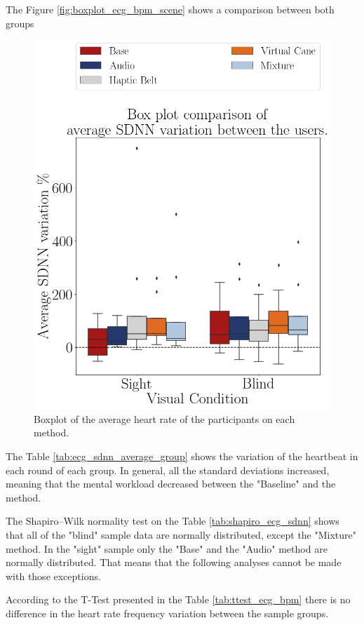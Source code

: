 The Figure \ref{fig:boxplot_ecg_bpm_scene} shows a comparison between both groups

\begin{figure}[!htb]
    \centering
    \includegraphics[width = 0.5\linewidth]{Resultados/ECG/Figuras/png/boxplot_ecg_sdnn_box_scene.png}
    \caption{Boxplot of the average heart rate of the participants on each method.}
    \label{fig:boxplot_ecg_sdnn_box_scene}
\end{figure}

The Table \ref{tab:ecg_sdnn_average_group} shows the variation of the heartbeat in each round of each group. In general, all the standard deviations increased, meaning that the mental workload decreased between the "Baseline" and the method.



The Shapiro–Wilk normality test on the Table \ref{tab:shapiro_ecg_sdnn} shows that all of the "blind" sample data are normally distributed, except the "Mixture" method. In the "sight" sample only the "Base" and the "Audio" method are normally distributed. That means that the following analyses cannot be made with those exceptions.

According to the T-Test presented in the Table \ref{tab:ttest_ecg_bpm} there is no difference in the heart rate frequency variation between the sample groups.

\begin{table}[!htb]
    \begin{minipage}{.45\linewidth}
        
    \end{minipage}
    \hfill
    \begin{minipage}{.45\linewidth}
        \vspace{-2.75cm}
        
    \end{minipage}
\end{table}

